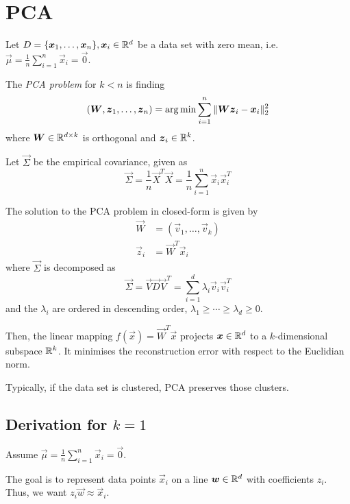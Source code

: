 \section{PCA}
Let
$D = \{\boldsymbol{x}_1, \dotsc, \boldsymbol{x}_n\}, \boldsymbol{x}_i \in \mathbb{R}^d$
be a data set with zero mean,
i.e. $\vec{\mu} = \frac{1}{n} \sum_{i=1}^n{\vec{x}_i} = \vec{0}$.

The \emph{PCA problem} for $k < n$ is finding
\begin{equation*}
    (\boldsymbol{W}, \boldsymbol{z}_1, \dotsc, \boldsymbol{z}_n) = \arg\min{
        \sum_{i=1}^n{\lVert\boldsymbol{W} \boldsymbol{z}_i - \boldsymbol{x}_i\rVert_2^2}
    }
\end{equation*}
where $\boldsymbol{W} \in \mathbb{R}^{d \times k}$ is orthogonal and
$\boldsymbol{z}_i \in \mathbb{R}^k$.

Let $\vec{\Sigma}$ be the empirical covariance, given as
\begin{equation*}
    \vec{\Sigma} =
    \frac{1}{n} \vec{X}^T \vec{X} =
    \frac{1}{n} \sum_{i=1}^n{
        \vec{x}_i \vec{x}_i^T
    }
\end{equation*}

The solution to the PCA problem in closed-form is given by
\begin{align*}
    \vec{W} &= (\vec{v}_1, \dotsc, \vec{v}_k) \\
    \vec{z}_i &= \vec{W}^T \vec{x}_i
\end{align*}
where $\vec{\Sigma}$ is decomposed as
\begin{equation*}
    \vec{\Sigma} = \vec{V} \vec{D} \vec{V}^T
    = \sum_{i=1}^d{\lambda_i \vec{v}_i \vec{v}_i^T}
\end{equation*}
and the $\lambda_i$ are ordered in descending order,
$\lambda_1 \geq \dotsb \geq \lambda_d \geq 0$.

Then, the linear mapping $f(\vec{x}) = \vec{W}^T \vec{x}$
projects $\boldsymbol{x} \in \mathbb{R}^d$ to a $k$-dimensional
subspace $\mathbb{R}^k$.
It minimises the reconstruction error with respect to
the Euclidian norm.

Typically, if the data set is clustered,
PCA preserves those clusters.


\subsection{Derivation for $k = 1$}
Assume $\vec{\mu} = \frac{1}{n} \sum_{i=1}^n{\vec{x}_i} = \vec{0}$.

The goal is to represent data points $\vec{x}_i$ on a line
$\boldsymbol{w} \in \mathbb{R}^d$ with coefficients $z_i$.
Thus, we want $z_i \vec{w} \approx \vec{x}_i$.

